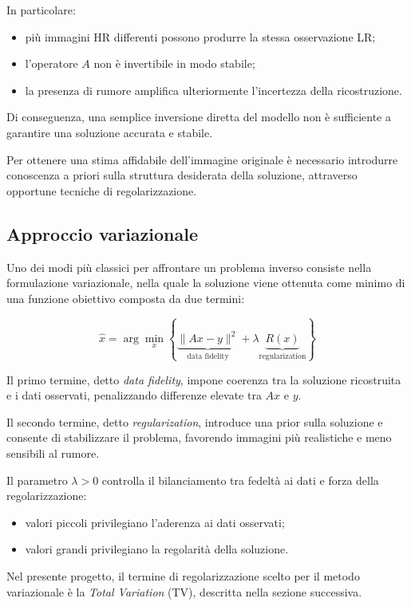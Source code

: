 \documentclass{article}
\begin{document}
In particolare:

\begin{itemize}
    \item più immagini HR differenti possono produrre la stessa osservazione LR;
    \item l’operatore \(A\) non è invertibile in modo stabile;
    \item la presenza di rumore amplifica ulteriormente l’incertezza della ricostruzione.
\end{itemize}

Di conseguenza, una semplice inversione diretta del modello non è sufficiente a garantire una soluzione accurata e stabile.

Per ottenere una stima affidabile dell’immagine originale è necessario introdurre conoscenza a priori sulla struttura desiderata della soluzione, attraverso opportune tecniche di regolarizzazione.

\subsection{Approccio variazionale}

Uno dei modi più classici per affrontare un problema inverso consiste nella formulazione variazionale, nella quale la soluzione viene ottenuta come minimo di una funzione obiettivo composta da due termini:

\[
\hat{x}
=
\arg\min_x
\left\{
\underbrace{\|Ax - y\|^2}_{\text{data fidelity}}
+
\lambda
\underbrace{R(x)}_{\text{regularization}}
\right\}
\]

Il primo termine, detto \textit{data fidelity}, impone coerenza tra la soluzione ricostruita e i dati osservati, penalizzando differenze elevate tra \(Ax\) e \(y\).

Il secondo termine, detto \textit{regularization}, introduce una prior sulla soluzione e consente di stabilizzare il problema, favorendo immagini più realistiche e meno sensibili al rumore.

Il parametro \(\lambda > 0\) controlla il bilanciamento tra fedeltà ai dati e forza della regolarizzazione:

\begin{itemize}
    \item valori piccoli privilegiano l’aderenza ai dati osservati;
    \item valori grandi privilegiano la regolarità della soluzione.
\end{itemize}

Nel presente progetto, il termine di regolarizzazione scelto per il metodo variazionale è la \textit{Total Variation} (TV), descritta nella sezione successiva.
\end{document}

